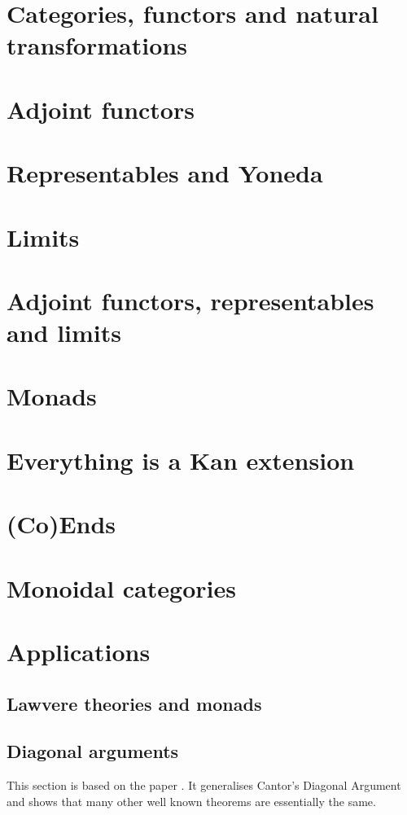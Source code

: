 \documentclass[12pt]{report}
\theoremstyle{definition}
\begin{document}
\section{Categories, functors and natural transformations}

\section{Adjoint functors}

\section{Representables and Yoneda}

\section{Limits}

\section{Adjoint functors, representables and limits}

\section{Monads}

\section{Everything is a Kan extension}

\section{(Co)Ends}

\section{Monoidal categories}

\section{Applications}

\subsection{Lawvere theories and monads}

\subsection{Diagonal arguments}\label{sec:category-theory:diagonal-arguments}
This section is based on the paper \cite{lawvere:diagonal_arguments_and_cartesian_closed_categories}. It generalises Cantor's Diagonal Argument and shows that many other well known theorems are essentially the same.
\end{document}
